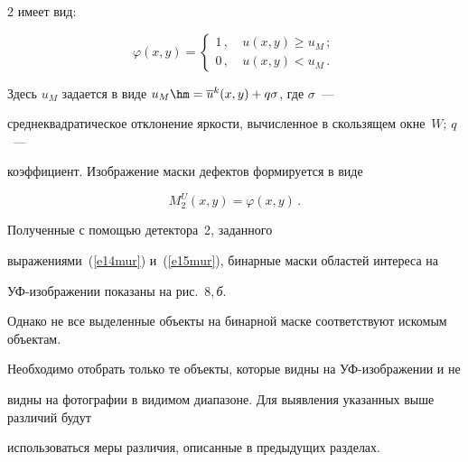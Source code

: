 \begin{multicols}{2}
имеет вид:


\begin{equation}


\varphi(x,y) =\begin{cases}


1\,, & \ u(x,y)\geq u_M\,;\\


0\,, & \ u(x,y)<u_M\,.


\end{cases}


\label{e14mur}


\end{equation}


Здесь $u_M$ задается в виде $u_M\hm=\overline{u}^k(x,y)+q\sigma$, где $\sigma$~--- 


среднеквадратическое отклонение яркости, вы\-чис\-лен\-ное в скользящем окне~$W$; $q$~--- 


коэффициент. Изображение маски дефектов формируется в виде 


\begin{equation}


M_2^U(x,y)=\varphi(x,y)\,.


\label{e15mur}


\end{equation}


  


  Полученные с помощью детектора~2, заданного 


  выражениями~(\ref{e14mur}) и~(\ref{e15mur}), бинарные маски областей интереса на 


  УФ-изоб\-ра\-же\-нии показаны на рис.~8,\,\textit{б}.








  


  Однако не все выделенные объекты на бинарной маске соответствуют искомым объектам. 


Необходимо отобрать только те объекты, которые видны на УФ-изоб\-ра\-же\-нии и не 


видны на фотографии в видимом диапазоне. Для выявления указанных выше различий будут 


использоваться меры различия, описанные в предыдущих разделах. 







\end{multicols}






